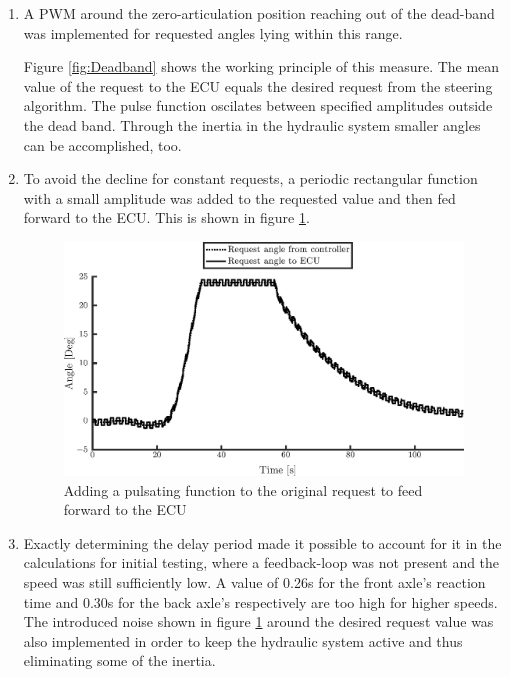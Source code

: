 \documentclass[root.tex]{subfiles}
\begin{document}
	\begin{enumerate}
		\item A \gls{PWM} around the zero-articulation position reaching out of the dead-band was implemented for requested angles lying within this range. 
		
		

		Figure \ref{fig:Deadband} shows the working principle of this measure. The mean value of the request to the \gls{ECU} equals the desired request from the steering algorithm. The pulse function oscilates between specified amplitudes outside the dead band. Through the inertia in the hydraulic system smaller angles can be accomplished, too.
		\item To avoid the decline for constant requests, a periodic rectangular function with a small amplitude was added to the requested value and then fed forward to the \gls{ECU}. This is shown in figure \ref{fig:Request_with_pulse}. 
		
		\begin{figure}[h!]

\includegraphics[width=1\linewidth]{Request_with_pulse}
\caption[Adding a pulsating function to the original request to feed forward to the ECU]{Adding a pulsating function to the original request to feed forward to the ECU}
\label{fig:Request_with_pulse}
\end{figure}

		
		\item Exactly determining the delay period made it possible to account for it in the calculations for initial testing, where a feedback-loop was not present and the speed was still sufficiently low. A value of 0.26\unit{s} for the front axle's reaction time and 0.30\unit{s} for the back axle's respectively are too high for higher speeds.\\
		The introduced noise shown in figure \ref{fig:Request_with_pulse} around the desired request value was also implemented in order to keep the hydraulic system active and thus eliminating some of the inertia. 
	\end{enumerate}
	
	
	
	
	
	
\end{document}
